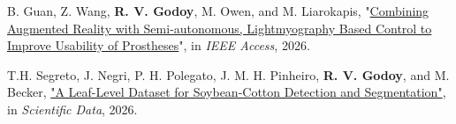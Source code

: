 \begin{cvparagraph}

\vspace{3pt} 













B. Guan, Z. Wang, \textbf{R. V. Godoy}, M. Owen, and M. Liarokapis, "\href{https://ieeexplore.ieee.org/document/11455092}{Combining Augmented Reality with Semi-autonomous, Lightmyography Based Control to Improve Usability of Prostheses}", in \textit{IEEE Access}, 2026.

T.H. Segreto, J. Negri, P. H. Polegato, J. M. H. Pinheiro, \textbf{R. V. Godoy}, and M. Becker, \href{https://www.nature.com/articles/s41597-026-07092-8}{"A Leaf-Level Dataset for Soybean-Cotton Detection and Segmentation"}, in \textit{Scientific Data}, 2026.



\end{cvparagraph}
